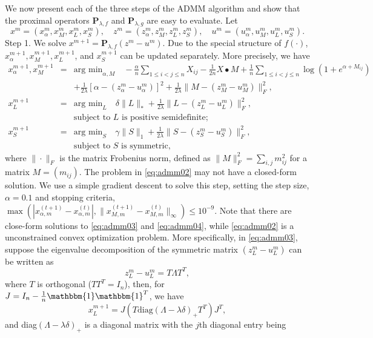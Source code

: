 \documentclass[AMS,STIX1COL]{WileyNJD-v2}
\begin{document}
We now present each of the three steps of the ADMM algorithm and show that the proximal
operators $\mathbf{P}_{\lambda,f}$ and $\mathbf{P}_{\lambda,g}$ are easy to evaluate.
Let
$$
x^m = (x^m_\alpha, x^m_M, x^m_L, x^m_S), \quad
z^m = (z^m_\alpha, z^m_M, z^m_L, z^m_S), \quad
u^m = (u^m_\alpha, u^m_M, u^m_L, u^m_S).
$$
Step 1. We solve $x^{m+1} = \mathbf{P}_{\lambda,f}(z^m - u^m)$.
Due to the special structure of $f(\cdot)$,
$x^{m+1}_\alpha, x^{m+1}_M, x^{m+1}_L$, and $x^{m+1}_S$
can be updated separately. 
More precisely, we have
\begin{eqnarray}
x^{m+1}_\alpha, x^{m+1}_M &=& \mbox{arg min}_{\alpha, M} \quad
-\frac{\alpha}{n} \sum_{1\le i< j\le n}X_{ij}
-\frac{1}{2n} X \bullet M
+ \frac{1}{n} \sum_{1\le i<j\le n} \log \left(1 + e^{\alpha + M_{ij}}\right) \nonumber \\
&& + \frac{1}{2\lambda}\left[\alpha - (z^m_\alpha - u^m_\alpha)\right]^2
+ \frac{1}{2\lambda}\|M - (z^m_M - u^m_M)\|^2_F, \label{eq:admm02} \\
x^{m+1}_L &=& \mbox{arg min}_{ L} \quad \delta \|L\|_\ast
+ \frac{1}{2\lambda}\|L - (z^m_L - u^m_L)\|^2_F,\label{eq:admm03}
\\
&& \mbox{subject to $L$ is positive semidefinite;} \nonumber \\
x^{m+1}_S &=& \mbox{arg min}_{ S} \quad  \gamma \|S\|_1
+ \frac{1}{2\lambda}\|S - (z^m_S - u^m_S)\|^2_F,
\label{eq:admm04}
\\
&& \mbox{subject to $S$ is symmetric,} \nonumber
\end{eqnarray}
where $\|\cdot\|_F$ is the matrix Frobenius norm, defined as
$\|M\|^2_F = \sum_{i,j} m^2_{ij}$ for a matrix $M = (m_{ij})$.
The problem in \eqref{eq:admm02} may not have a closed-form solution. 
We use a simple gradient descent to solve this step, setting the step size, $\alpha=0.1$ and stopping criteria, $\max(|x_{\alpha,m}^{(t+1)}-x_{\alpha,m}^{(t)}|,\|x_{M,m}^{(t+1)}-x_{M,m}^{(t)}\|_{\infty}) \leq 10^{-9}$. 
Note that there are close-form solutions to \eqref{eq:admm03} and \eqref{eq:admm04}, while \eqref{eq:admm02} is a unconstrained convex optimization problem. 
More specifically, in \eqref{eq:admm03}, suppose the eigenvalue decomposition of the symmetric matrix $(z^m_L - u^m_L)$ can be written as
$$
z^m_L - u^m_L = T \Lambda T^T,
$$
where $T$ is orthogonal ($T T^T = I_n$), then, for $J=I_{n}-\frac{1}{n}\mathbbm{1}\mathbbm{1}^T$, we have
$$
x^{m+1}_L = J (T \mbox{diag}(\Lambda-\lambda \delta)_+ T^T)J^{T},
$$
and diag$(\Lambda-\lambda \delta)_+$ is a diagonal matrix with the $j$th
diagonal entry being
\end{document}
